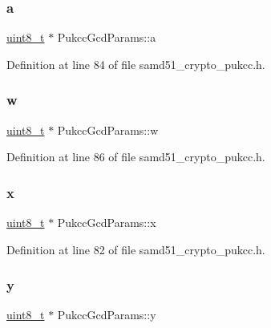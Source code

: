 \subsubsection{\texorpdfstring{a}{a}}
{\footnotesize\ttfamily \hyperlink{stdint_8h_aba7bc1797add20fe3efdf37ced1182c5}{uint8\+\_\+t} $\ast$ Pukcc\+Gcd\+Params\+::a}



Definition at line 84 of file samd51\+\_\+crypto\+\_\+pukcc.\+h.

\mbox{\label{structPukccGcdParams_a7a0a058cf90e42593eb5ace26a93ea44}} 
\subsubsection{\texorpdfstring{w}{w}}
{\footnotesize\ttfamily \hyperlink{stdint_8h_aba7bc1797add20fe3efdf37ced1182c5}{uint8\+\_\+t} $\ast$ Pukcc\+Gcd\+Params\+::w}



Definition at line 86 of file samd51\+\_\+crypto\+\_\+pukcc.\+h.

\mbox{\label{structPukccGcdParams_aaad588d0eb1db0d69f0fa1b93d2e4e67}} 
\subsubsection{\texorpdfstring{x}{x}}
{\footnotesize\ttfamily \hyperlink{stdint_8h_aba7bc1797add20fe3efdf37ced1182c5}{uint8\+\_\+t} $\ast$ Pukcc\+Gcd\+Params\+::x}



Definition at line 82 of file samd51\+\_\+crypto\+\_\+pukcc.\+h.

\mbox{\label{structPukccGcdParams_a57fe6aea2a7ac5b68f180bf6db554a18}} 
\subsubsection{\texorpdfstring{y}{y}}
{\footnotesize\ttfamily \hyperlink{stdint_8h_aba7bc1797add20fe3efdf37ced1182c5}{uint8\+\_\+t} $\ast$ Pukcc\+Gcd\+Params\+::y}



